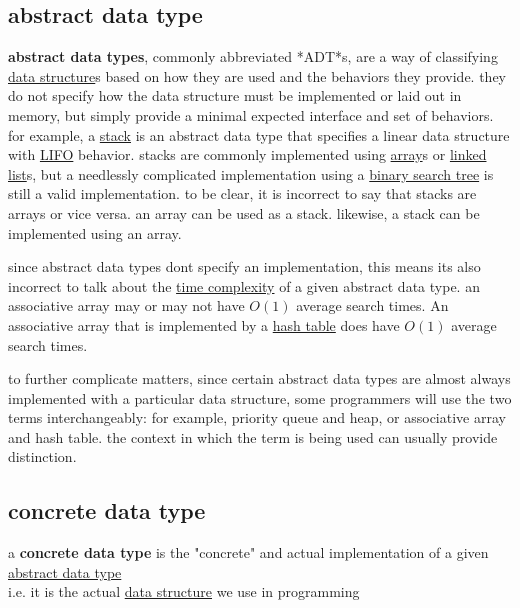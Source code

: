 \documentclass[a4paper,12pt]{article}
\begin{document}
\subsection{abstract data type}
\label{sec:orga3b31cf}
\begin{definition}
\textbf{abstract data types}, commonly abbreviated *ADT*s, are a way of classifying \hyperref[sec:org8f50ccd]{data structure}s based on how they are used and the behaviors they provide. they do not specify how the data structure must be implemented or laid out in memory, but simply provide a minimal expected interface and set of behaviors. for example, a \hyperref[sec:org1fa0f82]{stack} is an abstract data type that specifies a linear data structure with \hyperref[sec:org131c393]{LIFO} behavior. stacks are commonly implemented using \href{20220728190531-array.org}{array}s or \hyperref[sec:org3b67cf5]{linked list}s, but a needlessly complicated implementation using a \hyperref[sec:orge1ff544]{binary search tree} is still a valid implementation. to be clear, it is incorrect to say that stacks are arrays or vice versa. an array can be used as a stack. likewise, a stack can be implemented using an array.\\[0pt]
\begin{characteristic}
since abstract data types dont specify an implementation, this means its also incorrect to talk about the \href{20221130014441-time_complexity.org}{time complexity} of a given abstract data type. an associative array may or may not have \(O(1)\) average search times. An associative array that is implemented by a \hyperref[sec:org4f64d21]{hash table} does have \(O(1)\) average search times.\\[0pt]
\end{characteristic}

\begin{characteristic}
to further complicate matters, since certain abstract data types are almost always implemented with a particular data structure, some programmers will use the two terms interchangeably: for example, priority queue and heap, or associative array and hash table. the context in which the term is being used can usually provide distinction.\\[0pt]
\end{characteristic}
\end{definition}
\subsection{concrete data type}
\label{sec:org39a1299}
\begin{definition}
a \textbf{concrete data type} is the "concrete" and actual implementation of a given \hyperref[sec:orga3b31cf]{abstract data type}\\[0pt]
i.e. it is the actual \hyperref[sec:org8f50ccd]{data structure} we use in programming\\[0pt]
\end{definition}
\end{document}
